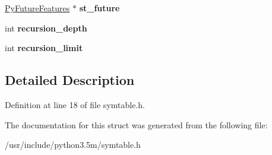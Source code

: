 \begin{DoxyCompactItemize}
\item 
\hyperlink{structPyFutureFeatures}{Py\+Future\+Features} $\ast$ {\bfseries st\+\_\+future}\hypertarget{structsymtable_ae8e551973e941466d3d5fee2f96c0815}{}\label{structsymtable_ae8e551973e941466d3d5fee2f96c0815}

\item 
int {\bfseries recursion\+\_\+depth}\hypertarget{structsymtable_af3722b3fc714efc89205483115e9e0ae}{}\label{structsymtable_af3722b3fc714efc89205483115e9e0ae}

\item 
int {\bfseries recursion\+\_\+limit}\hypertarget{structsymtable_aed793b168492f8eb27752d1c36122f80}{}\label{structsymtable_aed793b168492f8eb27752d1c36122f80}

\end{DoxyCompactItemize}


\subsection{Detailed Description}


Definition at line 18 of file symtable.\+h.



The documentation for this struct was generated from the following file\+:\begin{DoxyCompactItemize}
\item 
/usr/include/python3.\+5m/symtable.\+h\end{DoxyCompactItemize}
